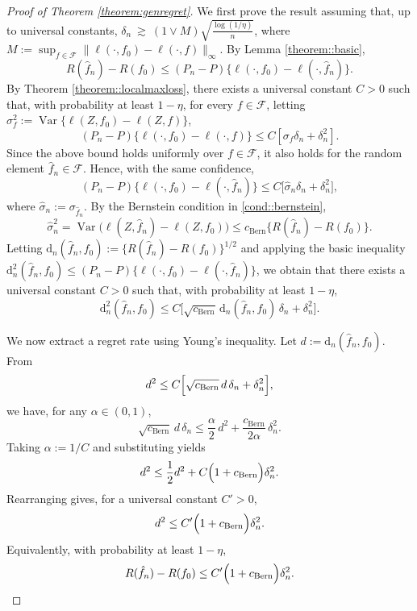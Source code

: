 \documentclass[11pt]{article}
\theoremstyle{plain}
\theoremstyle{definition} %
\newcommand{\Var}{\operatorname{Var}}
\begin{document}
\begin{proof}[Proof of Theorem \ref{theorem:genregret}]
We first prove the result assuming that, up to universal constants,
$\delta_n \ \gtrsim\ (1 \vee M)\sqrt{\frac{\log(1/\eta)}{n}}$, where
$M :=  \sup_{f \in \mathcal{F}} \|\ell(\cdot, f_0) - \ell(\cdot, f)\|_{\infty}$. By Lemma \ref{theorem::basic},
\[
R(\hat f_n)-R(f_0) \le (P_n-P)\bigl\{\ell(\cdot,f_0)-\ell(\cdot,\hat f_n)\bigr\}.
\]
By Theorem \ref{theorem::localmaxloss}, there exists a universal constant $C>0$ such that, with probability at least $1-\eta$, for every $f\in\mathcal{F}$,
letting $\sigma_f^2 := \Var\{\ell(Z, f_0) - \ell(Z, f)\}$,
\[
(P_n-P) \{\ell(\cdot, f_0) - \ell(\cdot, f)\}
\le
C\left[
\sigma_f\delta_n
+
\delta_n^2
\right].
\]
Since the above bound holds uniformly over $f \in \mathcal{F}$, it also holds for the random element
$\hat{f}_n \in \mathcal{F}$. Hence, with the same confidence,
\[
(P_n-P) \{\ell(\cdot, f_0) - \ell(\cdot, \hat f_n)\}
\le
C\Biggl[
\hat{\sigma}_n \delta_n
+
\delta_n^2
\Biggr],
\]
where $\hat{\sigma}_n := \sigma_{\hat f_n}$. By the Bernstein condition in \ref{cond::bernstein},
\[
\hat{\sigma}_n^2
=
\Var\bigl(\ell(Z,\hat f_n)-\ell(Z,f_0)\bigr)
\le
c_{\mathrm{Bern}}\{R(\hat f_n)-R(f_0)\}.
\]
Letting $\mathrm{d}_n(\hat f_n, f_0) := \{R(\hat f_n) - R(f_0)\}^{1/2}$ and applying the basic
inequality $\mathrm{d}_n^2(\hat f_n, f_0) \le (P_n-P)\{\ell(\cdot, f_0) - \ell(\cdot, \hat f_n)\}$,
we obtain that there exists a universal constant $C>0$ such that, with probability at least $1-\eta$,
\begin{equation}
\label{eqn::proofcriticalineq}
\mathrm{d}_n^2(\hat f_n, f_0)
\le
C\Biggl[
\sqrt{c_{\mathrm{Bern}}}\,\mathrm{d}_n(\hat f_n, f_0)\,\delta_n
+
\delta_n^2
\Biggr].
\end{equation}

We now extract a regret rate using Young's inequality. Let
\(d := \mathrm{d}_n(\hat f_n,f_0)\). From
\[
d^2 \le C\Bigl[\sqrt{c_{\mathrm{Bern}}}\,d\,\delta_n + \delta_n^2\Bigr],
\]
we have, for any \(\alpha\in(0,1)\),
\[
\sqrt{c_{\mathrm{Bern}}}\,d\,\delta_n
\le
\frac{\alpha}{2}\,d^2
+
\frac{c_{\mathrm{Bern}}}{2\alpha}\,\delta_n^2.
\]
Taking \(\alpha := 1/C\) and substituting yields
\[
d^2
\le
\frac{1}{2}d^2
+
C\Bigl(1+c_{\mathrm{Bern}}\Bigr)\delta_n^2.
\]
Rearranging gives, for a universal constant \(C'>0\),
\[
d^2
\le
C'\Bigl(1+c_{\mathrm{Bern}}\Bigr)\delta_n^2.
\]
Equivalently, with probability at least \(1-\eta\),
\[
R(\hat f_n)-R(f_0)
\le
C'\Bigl(1+c_{\mathrm{Bern}}\Bigr)\delta_n^2.
\]


\end{proof}
\end{document}
